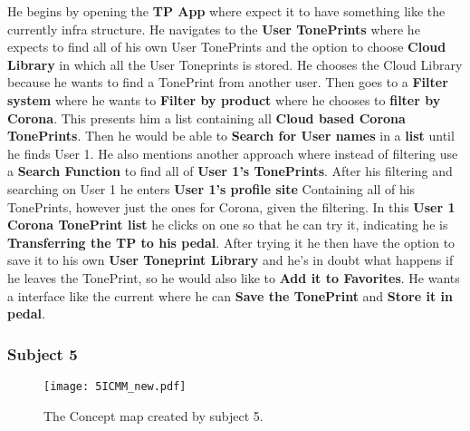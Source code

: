 He begins by opening the \textbf{TP App} where expect it to have something like the currently infra structure. He navigates to the \textbf{User TonePrints} where he expects to find all of his own User TonePrints and the option to choose \textbf{Cloud Library} in which all the User Toneprints is stored. He chooses the Cloud Library because he wants to find a TonePrint from another user. Then goes to a \textbf{Filter system} where he wants to \textbf{Filter by product} where he chooses to \textbf{filter by Corona}. This presents him a list containing all \textbf{Cloud based Corona TonePrints}. Then he would be able to \textbf{Search for User names} in a \textbf{list} until he finds User 1. He also mentions another approach where instead of filtering use a \textbf{Search Function} to find all of \textbf{User 1’s TonePrints}. After his filtering and searching on User 1 he enters \textbf{User 1’s profile site} Containing all of his TonePrints, however just the ones for Corona, given the filtering. In this \textbf{User 1 Corona TonePrint list} he clicks on one so that he can try it, indicating he is \textbf{Transferring the TP to his pedal}. After trying it he then have the option to save it to his own \textbf{User Toneprint Library} and he’s in doubt what happens if he leaves the TonePrint, so he would also like to \textbf{Add it to Favorites}. He wants a interface like the current where he can \textbf{Save the TonePrint} and \textbf{Store it in pedal}.

\subsubsection{Subject 5}
\label{Subject5ICMM}
\begin{figure}[H]
	\centering
	\texttt{[image: 5ICMM\_new.pdf]}
	\caption{The Concept map created by subject 5.}
	\label{fig:ICMM5}
\end{figure}

